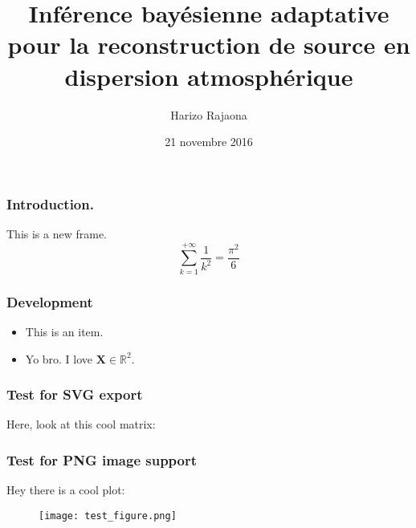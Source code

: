 \documentclass{beamer}
\title{Inférence bayésienne adaptative pour la reconstruction de source en dispersion atmosphérique}
\author{Harizo Rajaona}
\institute{CrisTaL - CEA - Aria Technologies}
\date{21 novembre 2016}
\begin{document}
	
	
\begin{frame}
	\titlepage
\end{frame}
\begin{frame}
	\frametitle{Introduction.}
	This is a new frame. \\
	
	$$\sum\limits_{k=1}^{+\infty} \dfrac{1}{k^2} = \dfrac{\pi^2}{6} $$
\end{frame}
\begin{frame}
	\frametitle{Development}
	\begin{itemize}
		\item This is an item.
		\item Yo bro. I love $\mathbf{X} \in \mathbb{R}^2$.
	\end{itemize}
\end{frame}
\begin{frame}
	\frametitle{Test for SVG export}
	Here, look at this cool matrix:
	\begin{figure}
		\centering
		\def\svgwidth{\columnwidth}
		
	\end{figure}
\end{frame}
\begin{frame}
	\frametitle{Test for PNG image support}
	Hey there is a cool plot:
	\begin{figure}
		\centering
			\texttt{[image: test\_figure.png]}
	\end{figure}
\end{frame}
\end{document}
